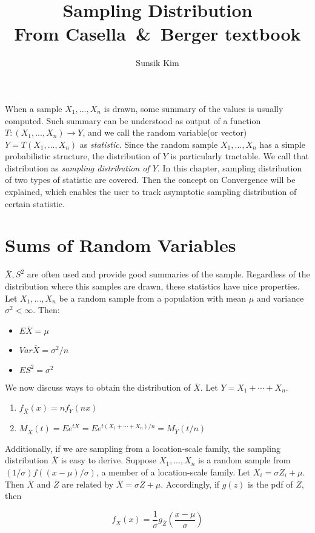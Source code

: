 \documentclass[10pt]{article}
\title{%
Sampling Distribution \\
\large{From Casella\ \&\ Berger textbook}}
\author{Sunsik Kim}
\date{}
\begin{document}
\maketitle
\noindent When a sample $X_1,...,X_n$ is drawn, some summary of the values is usually computed. Such summary can be understood as output of a function $T:(X_1,...,X_n) \rightarrow Y$, and we call the random variable(or vector) $Y=T(X_1,...,X_n)$ as \textit{statistic}. Since the random sample $X_1,...,X_n$ has a simple probabilistic structure, the distribution of $Y$ is particularly tractable. We call that distribution as \textit{sampling distribution of $Y$}. In this chapter, sampling distribution of two types of statistic are covered. Then the concept on Convergence will be explained, which enables the user to track asymptotic sampling distribution of certain statistic.

\section{Sums of Random Variables}
$\overline{X}, S^2$ are often used and provide good summaries of the sample. Regardless of the distribution where this samples are drawn, these statistics have nice properties. Let $X_1,...,X_n$ be a random sample from a population with mean $\mu$ and variance $\sigma^2<\infty$. Then:
\begin{itemize}
    \item $E\overline{X}=\mu$
    \item $Var\overline{X}=\sigma^2/n$ 
    \item $ES^2=\sigma^2$
\end{itemize}
We now discuss ways to obtain the distribution of $\overline{X}$. Let $Y=X_1+\cdots +X_n$.
\begin{enumerate}
    \item $f_{\overline{X}}(x)=nf_Y(nx)$
    \item $M_{\overline{X}}(t)=Ee^{t\overline{X}}=Ee^{t(X_1+\cdots +X_n)/n}=M_Y(t/n)$
\end{enumerate}
Additionally, if we are sampling from a location-scale family, the sampling distribution $\overline{X}$ is easy to derive. Suppose $X_1,...,X_n$ is a random sample from $(1/\sigma)f((x-\mu)/\sigma)$, a member of a location-scale family. Let $X_i=\sigma Z_i+\mu$. Then $\overline{X}$ and $\overline{Z}$ are related by $\overline{X}=\sigma\overline{Z}+\mu$. Accordingly, if $g(z)$ is the pdf of $\overline{Z}$, then

$$
f_{\overline{X}}(x)=\displaystyle \frac{1}{\sigma}g_{\overline{Z}}(\frac{x-\mu}{\sigma})
$$
\end{document}
